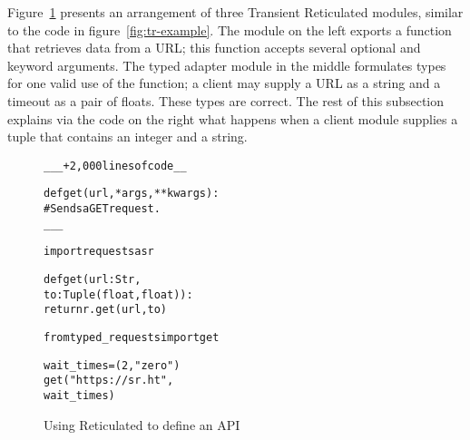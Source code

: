 
Figure~\ref{fig:retic-example} presents an arrangement of three Transient
Reticulated modules, similar to the code in figure~\ref{fig:tr-example}.
The module on the left exports a function that retrieves data from a URL; this
function accepts several optional and keyword arguments.  The typed adapter
module in the middle formulates types for one valid use of the function; a
client may supply a URL as a string and a timeout as a pair of floats.
These types are correct.
The rest of this subsection explains via the code on the right what happens
when a client module supplies a tuple that contains an integer and a string. 

\begin{figure}[htb]\footnotesize
  \vspace{-1mm}

\begin{minipage}[t]{1.8in}
\begin{alltt}
_ _ _ +2,000 lines of code _ _

def get(url, *args, **kwargs):
  # Sends a GET request.
  _ _ _
\end{alltt}
\end{minipage}\begin{minipage}[t]{1.8in}
\begin{alltt}
import requests as r

def get(url:Str, 
       to:Tuple(float, float)):
  return r.get(url, to)
\end{alltt}\end{minipage}\begin{minipage}[t]{1.8in}
\begin{alltt}
from typed_requests import get

wait_times = (2, "zero")
get("https://sr.ht",
    wait_times)
\end{alltt}\end{minipage}

  \caption{Using Reticulated to define an API} \label{fig:retic-example}
  \vspace{-1mm}
\end{figure}

